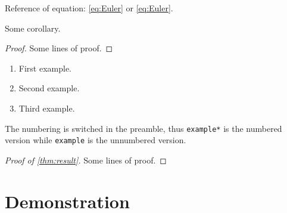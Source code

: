\documentclass[a4paper, 11pt,
  use style = plain,
  title in boldface,
  theorem in new line,
  emphasize theorems,
  theorem numbering = section,
  simple name,  %
  name in link, %
]{simplivre}
\numberwithin{equation}{section}
\begin{document}
\begin{emphasis}
  Reference of equation: \eqref{eq:Euler} or \cref{eq:Euler}.
\end{emphasis}

\begin{corollary}\label{cor:result}
  Some corollary.
\end{corollary}
\begin{proof}
  Some lines of proof.
\end{proof}

\begin{examples}
  \begin{enumerate}
      \item First example.
      \item Second example.
      \item Third example.
  \end{enumerate}
\end{examples}

\begin{example*}
  The numbering is switched in the preamble, thus \verb|example*| is the numbered version while \verb|example| is the unnumbered version.
\end{example*}

\begin{proof}[Proof of \cref{thm:result}]
    Some lines of proof.
\end{proof}

\part{Demonstration}

\blinddocument

\backmatter

\printindex
\end{document}
